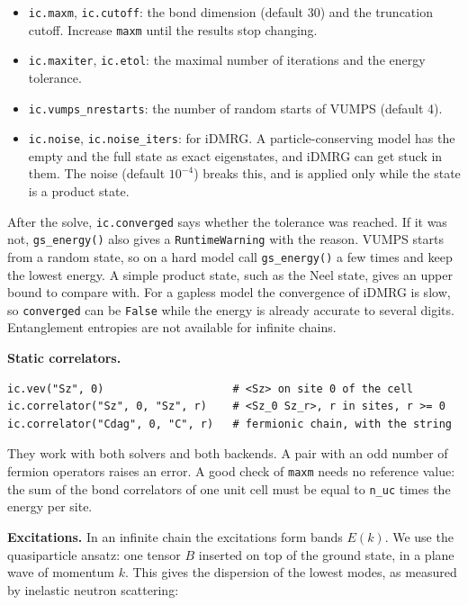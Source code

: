 \documentclass[11pt]{article}
\providecommand{\tightlist}{\setlength{\itemsep}{0pt}\setlength{\parskip}{0pt}}
\begin{document}
\begin{itemize}
\tightlist
\item
  \texttt{ic.\allowbreak{}maxm}, \texttt{ic.\allowbreak{}cutoff}: the bond dimension (default 30) and the
  truncation cutoff. Increase \texttt{maxm} until the results stop changing.
\item
  \texttt{ic.\allowbreak{}maxiter}, \texttt{ic.\allowbreak{}etol}: the maximal number of iterations and the
  energy tolerance.
\item
  \texttt{ic.\allowbreak{}vumps\_\allowbreak{}nrestarts}: the number of random starts of VUMPS (default 4).
\item
  \texttt{ic.\allowbreak{}noise}, \texttt{ic.\allowbreak{}noise\_\allowbreak{}iters}: for iDMRG. A particle-conserving model has
  the empty and the full state as exact eigenstates, and iDMRG can get
  stuck in them. The noise (default \(10^{-4}\)) breaks this, and is applied
  only while the state is a product state.
\end{itemize}

After the solve, \texttt{ic.\allowbreak{}converged} says whether the tolerance was reached.
If it was not, \texttt{gs\_\allowbreak{}energy()} also gives a \texttt{RuntimeWarning} with the
reason. VUMPS starts from a random state, so on a hard model
call \texttt{gs\_\allowbreak{}energy()} a few times and keep the lowest energy. A simple
product state, such as the Neel state, gives an upper bound to compare
with. For a gapless
model the convergence of iDMRG is slow, so \texttt{converged} can be \texttt{False}
while the energy is already accurate to several digits. Entanglement
entropies are not available for infinite chains.

\textbf{Static correlators.}

\begin{lstlisting}
ic.vev("Sz", 0)                    # <Sz> on site 0 of the cell
ic.correlator("Sz", 0, "Sz", r)    # <Sz_0 Sz_r>, r in sites, r >= 0
ic.correlator("Cdag", 0, "C", r)   # fermionic chain, with the string
\end{lstlisting}

They work with both solvers and both backends. A pair with an odd number
of fermion operators raises an error. A good check of \texttt{maxm} needs no
reference value: the sum of the bond correlators of one unit cell must be
equal to \texttt{n\_\allowbreak{}uc} times the energy per site.

\textbf{Excitations.} In an infinite chain the excitations form bands \(E(k)\).
We use the quasiparticle ansatz: one tensor \(B\) inserted on top of the
ground state, in a plane wave of momentum \(k\). This gives the dispersion
of the lowest modes, as measured by inelastic neutron scattering:
\end{document}
